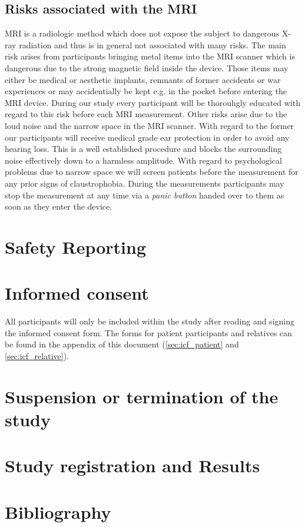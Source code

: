 \subsection{Risks associated with the \ac{MRI}}
\ac{MRI} is a radiologic method which does not expose the subject to
dangerous X-ray radiation and thus is in general not associated with
many risks. The main risk arises from participants bringing metal
items into the \ac{MRI} scanner which is dangerous due to the strong
magnetic field inside the device. Those items may either be medical or
aesthetic implants, remnants of former accidents or war experiences or
may accidentially be kept e.g. in the pocket before entering the
\ac{MRI} device. During our study every participant will be thorouhgly
educated with regard to this risk before each \ac{MRI}
measurement. Other risks arise due to the loud noise and the narrow
space in the \ac{MRI} scanner. With regard to the former our
participants will receive medical grade ear protection in order to
avoid any hearing loss. This is a well established procedure and
blocks the surrounding noise effectively down to a harmless
amplitude. With regard to psychological problems due to narrow space
we will screen patients before the measurement for any prior signs of
claustrophobia. During the measurements participants may stop the
measurement at any time via a \emph{panic button} handed over to them
as soon as they enter the device.

\section{Safety Reporting}

\section{Informed consent}
All participants will only be included within the study after reading
and signing the informed consent form. The forms for patient
participants and relatives can be found in the appendix of this
document (\ref{sec:icf_patient} and \ref{sec:icf_relative}).

\section{Suspension or termination of the study}

\section{Study registration and Results}

\section{Bibliography}
